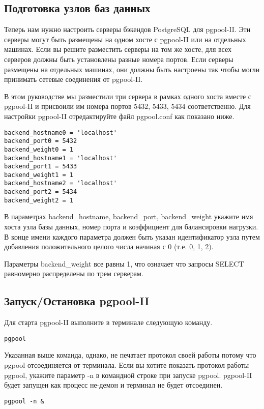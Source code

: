 \subsection{Подготовка узлов баз данных}
Теперь нам нужно настроить серверы бэкендов PostgreSQL для pgpool-II. Эти серверы могут быть размещены на одном
хосте с pgpool-II или на отдельных машинах. Если вы решите разместить серверы на том же хосте, для всех серверов
должны быть установлены разные номера портов. Если серверы размещены на отдельных машинах, они должны быть настроены
так чтобы могли принимать сетевые соединения от pgpool-II.

В этом руководстве мы разместили три сервера в рамках одного хоста вместе с pgpool-II и присвоили им номера портов
5432, 5433, 5434 соответственно. Для настройки pgpool-II отредактируйте файл pgpool.conf как показано ниже.
\begin{lstlisting}[label=lst:pgpool10,caption=Подготовка узлов баз данных]
backend_hostname0 = 'localhost'
backend_port0 = 5432
backend_weight0 = 1
backend_hostname1 = 'localhost'
backend_port1 = 5433
backend_weight1 = 1
backend_hostname2 = 'localhost'
backend_port2 = 5434
backend_weight2 = 1
\end{lstlisting}

В параметрах backend\_hostname, backend\_port, backend\_weight укажите имя хоста узла базы данных, номер порта и
коэффициент для балансировки нагрузки. В конце имени каждого параметра должен быть указан идентификатор узла путем
добавления положительного целого числа начиная с 0 (т.е. 0, 1, 2).

Параметры backend\_weight все равны 1, что означает что запросы SELECT равномерно распределены по трем серверам.

\subsection{Запуск/Остановка pgpool-II}
Для старта pgpool-II выполните в терминале следующую команду.
\begin{lstlisting}[label=lst:pgpool11,caption=Запуск]
pgpool
\end{lstlisting}

Указанная выше команда, однако, не печатает протокол своей работы потому что pgpool отсоединяется от терминала.
Если вы хотите показать протокол работы pgpool, укажите параметр -n в командной строке при запуске pgpool.
pgpool-II будет запущен как процесс не-демон и терминал не будет отсоединен.
\begin{lstlisting}[label=lst:pgpool12,caption=Запуск]
pgpool -n &
\end{lstlisting}

